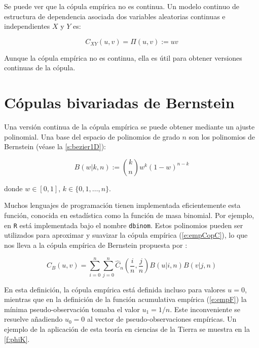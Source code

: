 

Se puede ver que la c\'opula emp\'irica no es continua. Un modelo continuo de estructura de dependencia asociada dos variables aleatorias continuas e independientes $X$ y $Y$ es:

\begin{equation}
C_{XY}(u,v) = \Pi (u, v) := uv
\label{e:IndCop}
\end{equation}

Aunque la c\'opula emp\'irica no es continua, ella es \'util para obtener versiones continuas de la c\'opula.

\section{C\'opulas bivariadas de Bernstein}

Una versi\'on continua de la c\'opula emp\'irica se puede obtener mediante un ajuste polinomial. Una base del espacio de polinomios de grado $n$ son los polinomios de Bernstein (v\'ease la \autoref{s:bezier1D}):

\begin{equation}
	B(w|k,n):=\binom{k}{n} w^k (1 - w)^{n-k}
	\label{eq:bernsBasis}
\end{equation}

\noindent
donde $w \in [0,1]$, $k \in \{0,1, \ldots, n\}$.

Muchos lenguajes de programaci\'on tienen implementada eficientemente esta funci\'on, conocida en estad\'istica como la funci\'on de masa binomial. Por ejemplo, en \verb|R| est\'a implementada bajo el nombre \verb|dbinom|. Estos polinomios pueden ser utilizados para aproximar y suavizar la c\'opula emp\'irica (\autoref{e:empCopC}), lo que nos lleva a la c\'opula emp\'irica de Bernstein propuesta por \cite{sancetta_bernstein_2004}:

\begin{equation}
	C_B(u,v)=\sum_{i=0}^n \sum_{j=0}^n
	\hat{C}_n 
	\left(
	\frac{i}{n},\frac{j}{n}
\right)
B(u|i,n) B(v|j,n)
\end{equation}

En esta definici\'on, la c\'opula emp\'irica est\'a definida incluso para valores $u=0$, mientras que en la definici\'on de la funci\'on acumulativa emp\'irica (\autoref{e:empF}) la m\'inima pseudo-observaci\'on tomaba el valor $u_1 = 1/n$. Este inconveniente se resuelve a\~nadiendo $u_0 = 0$ \citep{sancetta_bernstein_2004} al vector de pseudo-observaciones emp\'iricas. Un ejemplo de la aplicaci\'on de esta teor\'ia en ciencias de la Tierra se muestra en la \autoref{f:phiK}.

